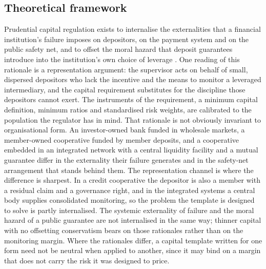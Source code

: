 \documentclass[11pt,a4paper]{article}
\begin{document}
\subsection{Theoretical framework}
\label{sec:theory}

Prudential capital regulation exists to internalise the externalities that a financial
institution's failure imposes on depositors, on the payment system and on the public
safety net, and to offset the moral hazard that deposit guarantees introduce into the
institution's own choice of leverage \citep{bcbs2011}. One reading of this rationale is a
representation argument: the supervisor acts on behalf of small, dispersed depositors who
lack the incentive and the means to monitor a leveraged intermediary, and the capital
requirement substitutes for the discipline those depositors cannot exert. The instruments
of the requirement, a minimum capital definition, minimum ratios and standardised risk
weights, are calibrated to the population the regulator has in mind. That rationale is
not obviously invariant to organisational form. An investor-owned bank funded in
wholesale markets, a member-owned cooperative funded by member deposits, and a
cooperative embedded in an integrated network with a central liquidity facility and a
mutual guarantee differ in the externality their failure generates and in the safety-net
arrangement that stands behind them. The representation channel is where the difference
is sharpest. In a credit cooperative the depositor is also a member with a residual claim
and a governance right, and in the integrated systems a central body supplies
consolidated monitoring, so the problem the template is designed to solve is partly
internalised. The systemic externality of failure and the moral hazard of a public
guarantee are not internalised in the same way; thinner capital with no offsetting
conservatism bears on those rationales rather than on the monitoring margin. Where the
rationales differ, a capital template written for one form need not be neutral when
applied to another, since it may bind on a margin that does not carry the risk it was
designed to price.
\end{document}
